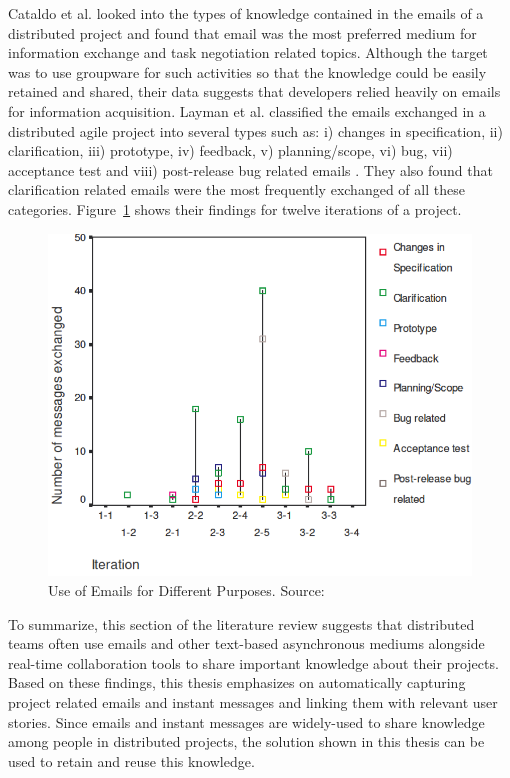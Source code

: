Cataldo et al. looked into the types of knowledge contained in the emails of a distributed project and found that email was the most preferred medium for information exchange and task negotiation related topics\cite{on_coord}. Although the target was to use groupware for such activities so that the knowledge could be easily retained and shared, their data suggests that developers relied heavily on emails for information acquisition. Layman et al. classified the emails exchanged in a distributed agile project into several types such as: i) changes in specification, ii) clarification, iii) prototype, iv) feedback, v) planning/scope, vi) bug, vii) acceptance test and viii) post-release bug related emails \cite{essential_communication}. They also found that clarification related emails were the most frequently exchanged of all these categories. Figure~\ref{fig:layman} shows their findings for twelve iterations of a project.

\begin{figure}[h!]
	\centering
	\includegraphics[width=\textwidth]{Layman.png}
    \caption{Use of Emails for Different Purposes. Source: \cite{essential_communication}}
	\label{fig:layman}
\end{figure}

To summarize, this section of the literature review suggests that distributed teams often use emails and other text-based asynchronous mediums alongside real-time collaboration tools to share important knowledge about their projects. Based on these findings, this thesis emphasizes on automatically capturing project related emails and instant messages and linking them with relevant user stories. Since emails and instant messages are widely-used to share knowledge among people in distributed projects, the solution shown in this thesis can be used to retain and reuse this knowledge.

